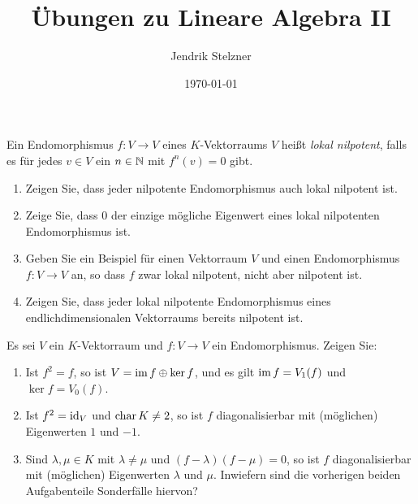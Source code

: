 \documentclass[a4paper,10pt]{scrartcl}
\title{Übungen zu Lineare Algebra II}
\author{Jendrik Stelzner}
\date{\today}
\begin{document}
\maketitle





\begin{question}
  Ein Endomorphismus $f \colon V \to V$ eines $K$-Vektorraums $V$ heißt \emph{lokal nilpotent}, falls es für jedes $v \in V$ ein $n \in \mathbb{N}$ mit $f^n(v) = 0$ gibt.
  \begin{enumerate}[leftmargin=*]
    \item
      Zeigen Sie, dass jeder nilpotente Endomorphismus auch lokal nilpotent ist.
    \item
      Zeige Sie, dass $0$ der einzige mögliche Eigenwert eines lokal nilpotenten Endomorphismus ist.
    \item
      Geben Sie ein Beispiel für einen Vektorraum $V$ und einen Endomorphismus $f \colon V \to V$ an, so dass $f$ zwar lokal nilpotent, nicht aber nilpotent ist.
    \item
      Zeigen Sie, dass jeder lokal nilpotente Endomorphismus eines endlichdimensionalen Vektorraums bereits nilpotent ist.
  \end{enumerate}
\end{question}


\begin{question}
  Es sei $V$ ein $K$-Vektorraum und $f \colon V \to V$ ein Endomorphismus.
  Zeigen Sie:
  \begin{enumerate}[leftmargin=*]
    \item
      Ist $f^2 = f$, so ist $V = \operatorname{im} f \oplus \ker f$, und es gilt $\operatorname{im} f = V_1(f)$ und $\ker f = V_0(f)$.
    \item
      Ist $f^2 = \operatorname{id}_V$ und $\operatorname{char} K \neq 2$, so ist $f$ diagonalisierbar mit (möglichen) Eigenwerten $1$ und $-1$.
    \item
      Sind $\lambda, \mu \in K$ mit $\lambda \neq \mu$ und $(f-\lambda)(f-\mu) = 0$, so ist $f$ diagonalisierbar mit (möglichen) Eigenwerten $\lambda$ und $\mu$.
      Inwiefern sind die vorherigen beiden Aufgabenteile Sonderfälle hiervon?
  \end{enumerate}
\end{question}
\end{document}
